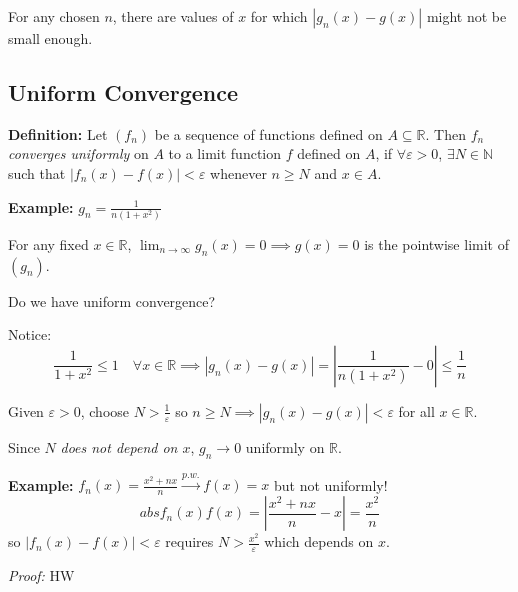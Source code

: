 \documentclass[12pt]{report}
\newcommand{\R}{\mathbb{R}}
\newcommand{\N}{\mathbb{N}}
\newcommand{\abs}[1]{\left\vert #1 \right\vert}
\newcommand{\ep}{\varepsilon}
\newenvironment*{tbox}[2][gray]{
    \begin{tcolorbox}[
        parbox=false,
        colback=#1!5!white,
        colframe=#1!75!black,
        breakable,
        title={#2}
    ]}
    {\end{tcolorbox}}
\begin{document}
        For any chosen $n$, there are values of $x$ for which $\abs{g_n(x) - g(x)}$ might not be small enough. 
        
    \subsection*{Uniform Convergence}
        \textbf{Definition:} Let $(f_n)$ be a sequence of functions defined on $A \subseteq \R$. Then $f_n$ \emph{converges uniformly} on $A$ to a limit function $f$ defined on $A$, if $\forall \ep > 0$, $\exists N \in \N$ such that $\abs{f_n(x) - f(x)} < \ep$ whenever $n \geq N$ and $x \in A$.

        \textbf{Example:} $g_n = \frac{1}{n(1 + x^2)}$ 

        For any fixed $x \in \R$, $\lim_{n \to \infty} g_n(x) = 0 \implies g(x) = 0$ is the pointwise limit of $(g_n)$. 

        Do we have uniform convergence?

        Notice: 
        \[\frac{1}{1 + x^2} \leq 1 \quad \forall x \in \R \implies \abs{g_n(x) - g(x)} = \abs{\frac{1}{n(1 + x^2)} - 0} \leq \frac{1}{n}\]

        Given $\ep > 0$, choose $N > \frac{1}{\ep}$ so $n \geq N \implies \abs{g_n(x) - g(x)} < \ep$ for all $x \in \R$. 

        Since $N$ \emph{does not depend on $x$}, $g_n \to 0$ uniformly on $\R$. 

        \textbf{Example:} $f_n(x) = \frac{x^2 + nx}{n} \overset{p.w.}{\longrightarrow} f(x) = x$ but not uniformly! 
        \[abs{f_n(x)  f(x)} = \abs{\frac{x^2 + nx}{n} - x} = \frac{x^2}{n}\] 
        so $\abs{f_n(x) - f(x)} < \ep$ requires $N > \frac{x^2}{\ep}$ which depends on $x$. 
        
        \begin{tbox}{\textbf{Theorem (Cauchy Criterion for Uniform Convergence):} A sequence of functions $(f_n)$ defined on a set $A \subseteq \R$ converges uniformly on $A$ iff $\forall \ep > 0$, $\exists N \in \N$ such that $\abs{f_n(x) - f_m(x)} < \ep$ whenever $n, m \geq N$ and $x \in A$.}
            \emph{Proof:} HW
        \end{tbox}
\end{document}

